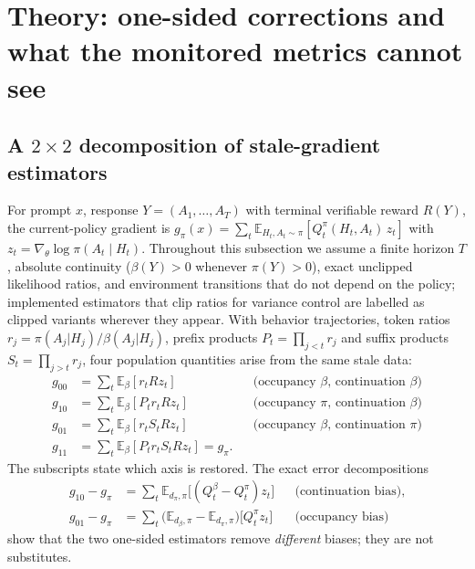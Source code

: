 \documentclass[11pt]{article}
\newcommand{\goo}{g_{00}}
\newcommand{\gto}{g_{10}}
\newcommand{\got}{g_{01}}
\newcommand{\gtt}{g_{11}}
\newcommand{\gpi}{g_{\pi}}
\begin{document}
\section{Theory: one-sided corrections and what the monitored metrics cannot see}
\label{sec:theory}

\subsection{A \texorpdfstring{$2\times 2$}{2 x 2} decomposition of stale-gradient estimators}

For prompt $x$, response $Y=(A_1,\dots,A_T)$ with terminal verifiable reward
$R(Y)$, the current-policy gradient is
$\gpi(x)=\sum_t \mathbb{E}_{H_t,A_t\sim\pi}[Q_t^{\pi}(H_t,A_t)\,z_t]$ with
$z_t=\nabla_\theta\log\pi(A_t\mid H_t)$. Throughout this subsection we assume
a finite horizon $T$, absolute continuity ($\beta(Y)>0$ whenever $\pi(Y)>0$),
exact unclipped likelihood ratios, and environment transitions that do not
depend on the policy; implemented estimators that clip ratios for variance
control are labelled as clipped variants wherever they appear. With behavior
trajectories, token
ratios $r_j=\pi(A_j|H_j)/\beta(A_j|H_j)$, prefix products $P_t=\prod_{j<t}r_j$
and suffix products $S_t=\prod_{j>t}r_j$, four population quantities arise from
the same stale data:
\begin{align*}
\goo&=\textstyle\sum_t\mathbb{E}_\beta[r_t R z_t]
 &&\text{(occupancy }\beta\text{, continuation }\beta\text{)}\\
\gto&=\textstyle\sum_t\mathbb{E}_\beta[P_t r_t R z_t]
 &&\text{(occupancy }\pi\text{, continuation }\beta\text{)}\\
\got&=\textstyle\sum_t\mathbb{E}_\beta[r_t S_t R z_t]
 &&\text{(occupancy }\beta\text{, continuation }\pi\text{)}\\
\gtt&=\textstyle\sum_t\mathbb{E}_\beta[P_t r_t S_t R z_t]=\gpi.
 &&
\end{align*}
The subscripts state which axis is restored. The exact error decompositions
\begin{align*}
\gto-\gpi
&=\sum_t\mathbb{E}_{d_\pi,\pi}\!\big[(Q_t^{\beta}-Q_t^{\pi})z_t\big]
&&\text{(continuation bias)},\\
\got-\gpi
&=\sum_t\big(\mathbb{E}_{d_\beta,\pi}-\mathbb{E}_{d_\pi,\pi}\big)
\!\big[Q_t^{\pi}z_t\big]
&&\text{(occupancy bias)}
\end{align*}
show that the two one-sided estimators remove \emph{different} biases; they are
not substitutes.
\end{document}
